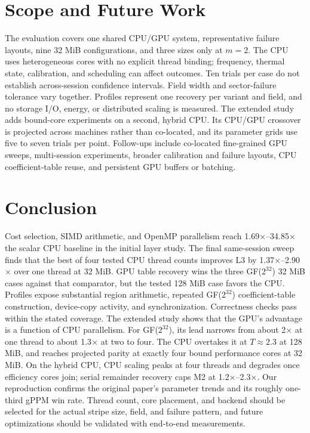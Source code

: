 \documentclass[conference]{IEEEtran}
\begin{document}
\section{Scope and Future Work}
The evaluation covers one shared CPU/GPU system, representative failure layouts, nine 32 MiB configurations, and three sizes only at $m=2$. The CPU uses heterogeneous cores with no explicit thread binding; frequency, thermal state, calibration, and scheduling can affect outcomes. Ten trials per case do not establish across-session confidence intervals. Field width and sector-failure tolerance vary together. Profiles represent one recovery per variant and field, and no storage I/O, energy, or distributed scaling is measured. The extended study adds bound-core experiments on a second, hybrid CPU. Its CPU/GPU crossover is projected across machines rather than co-located, and its parameter grids use five to seven trials per point. Follow-ups include co-located fine-grained GPU sweeps, multi-session experiments, broader calibration and failure layouts, CPU coefficient-table reuse, and persistent GPU buffers or batching.

\section{Conclusion}
Cost selection, SIMD arithmetic, and OpenMP parallelism reach 1.69$\times$--34.85$\times$ the scalar CPU baseline in the initial layer study. The final same-session sweep finds that the best of four tested CPU thread counts improves L3 by 1.37$\times$--2.90$\times$ over one thread at 32 MiB. GPU table recovery wins the three GF($2^{32}$) 32 MiB cases against that comparator, but the tested 128 MiB case favors the CPU. Profiles expose substantial region arithmetic, repeated GF($2^{32}$) coefficient-table construction, device-copy activity, and synchronization. Correctness checks pass within the stated coverage. The extended study shows that the GPU's advantage is a function of CPU parallelism. For GF($2^{32}$), its lead narrows from about 2$\times$ at one thread to about 1.3$\times$ at two to four. The CPU overtakes it at $T\approx2.3$ at 128 MiB, and reaches projected parity at exactly four bound performance cores at 32 MiB. On the hybrid CPU, CPU scaling peaks at four threads and degrades once efficiency cores join; serial remainder recovery caps M2 at 1.2$\times$--2.3$\times$. Our reproduction confirms the original paper's parameter trends and its roughly one-third gPPM win rate. Thread count, core placement, and backend should be selected for the actual stripe size, field, and failure pattern, and future optimizations should be validated with end-to-end measurements.
\end{document}
